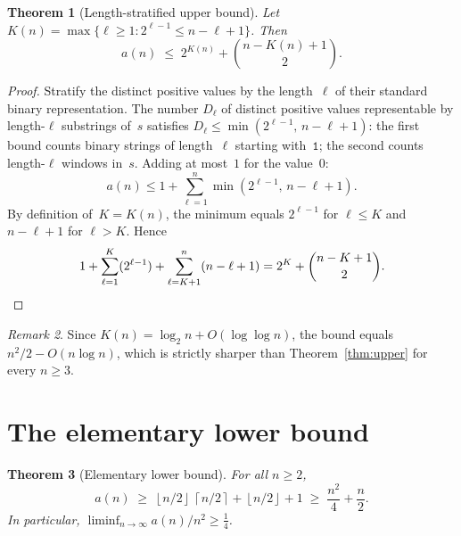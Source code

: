 \documentclass[11pt,a4paper]{article}
\theoremstyle{plain}
\newtheorem{theorem}{Theorem}[section]
\theoremstyle{definition}
\theoremstyle{remark}
\newtheorem{remark}[theorem]{Remark}
\newcommand{\floor}[1]{\left\lfloor #1 \right\rfloor}
\newcommand{\ceil}[1]{\left\lceil #1 \right\rceil}
\begin{document}
\begin{theorem}[Length-stratified upper bound]\label{thm:length-strat}
  Let $K(n) = \max\{\ell \ge 1 : 2^{\ell-1} \le n - \ell + 1\}$.  Then
  \[
    a(n) \;\le\; 2^{K(n)} + \binom{n - K(n) + 1}{2}.
  \]
\end{theorem}

\begin{proof}
  Stratify the distinct positive values by the length~$\ell$ of their
  standard binary representation.  The number $D_\ell$ of distinct
  positive values representable by length-$\ell$ substrings of~$s$
  satisfies $D_\ell \le \min(2^{\ell-1},\, n - \ell + 1)$: the first
  bound counts binary strings of length~$\ell$ starting
  with~$\mathtt{1}$; the second counts length-$\ell$ windows in~$s$.
  Adding at most~$1$ for the value~$0$:
  \[
    a(n) \le 1 + \sum_{\ell=1}^{n} \min(2^{\ell-1},\, n - \ell + 1).
  \]
  By definition of~$K = K(n)$, the minimum equals $2^{\ell-1}$ for
  $\ell \le K$ and $n - \ell + 1$ for $\ell > K$.  Hence
  \[
    1 + \sum_{\ell=1}^{K}(2^{\ell-1})
      + \sum_{\ell=K+1}^{n}(n - \ell + 1)
    = 2^{K} + \binom{n - K + 1}{2}. \qedhere
  \]
\end{proof}

\begin{remark}
  Since $K(n) = \log_2 n + O(\log\log n)$, the bound equals
  $n^2/2 - O(n \log n)$, which is strictly sharper than
  Theorem~\ref{thm:upper} for every $n \ge 3$.
\end{remark}

\section{The elementary lower bound}\label{sec:lower}

\begin{theorem}[Elementary lower bound]\label{thm:lower}
  For all $n \ge 2$,
  \[
    a(n) \;\ge\; \floor{n/2}\,\ceil{n/2} + \floor{n/2} + 1
         \;\ge\; \frac{n^2}{4} + \frac{n}{2}.
  \]
  In particular, $\liminf_{n\to\infty} a(n)/n^2 \ge \frac{1}{4}$.
\end{theorem}
\end{document}
